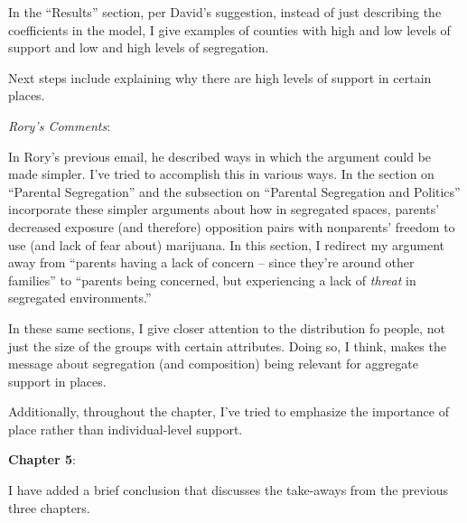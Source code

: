 \documentclass[12pt,stdletter,dateno,sigleft]{newlfm} %
\begin{document}
\begin{newlfm}
In the ``Results'' section, per David's suggestion, instead of just describing the coefficients in the model, {\color{red}I give examples of counties with high and low levels of support and low and high levels of segregation}.

Next steps include explaining why there are high levels of support in certain places. \newline

\textit{Rory's Comments}:

In Rory's previous email, he described ways in which the argument could be made simpler. I've tried to accomplish this in various ways. In the section on ``Parental Segregation'' and the subsection on ``Parental Segregation and Politics'' incorporate these simpler arguments about how in segregated spaces, parents' decreased exposure (and therefore) opposition pairs with nonparents' freedom to use (and lack of fear about) marijuana.  In this section, I redirect my argument away from ``parents having a lack of concern -- since they're around other families'' to ``parents being concerned, but experiencing a lack of \textit{threat} in segregated environments.''

In these same sections, I give closer attention to the distribution fo people, not just the size of the groups with certain attributes. Doing so, I think, makes the message about segregation (and composition) being relevant for aggregate support in places.

Additionally, throughout the chapter, I've tried to emphasize the importance of place rather than individual-level support. 


\textbf{Chapter 5}: 

I have added a brief conclusion that discusses the take-aways from the previous three chapters.



\end{newlfm}
\end{document}
